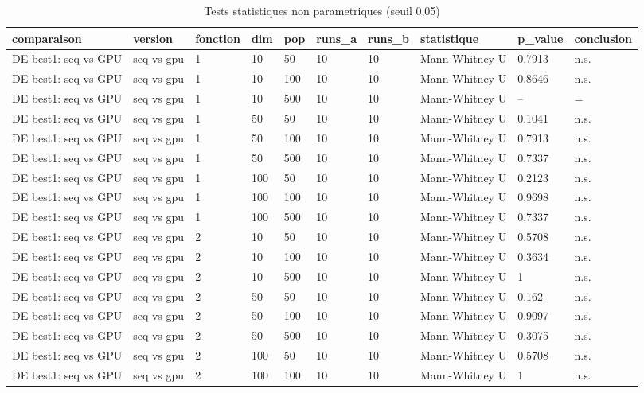 \begin{table}[t]
\centering
\caption{Tests statistiques non parametriques (seuil 0,05)}
\label{tab:generated-tests}
\scriptsize
\begin{tabular}{llllllllll}
\toprule
comparaison & version & fonction & dim & pop & runs\_a & runs\_b & statistique & p\_value & conclusion \\
\midrule
DE best1: seq vs GPU & seq vs gpu & 1 & 10 & 50 & 10 & 10 & Mann-Whitney U & 0.7913 & n.s. \\
DE best1: seq vs GPU & seq vs gpu & 1 & 10 & 100 & 10 & 10 & Mann-Whitney U & 0.8646 & n.s. \\
DE best1: seq vs GPU & seq vs gpu & 1 & 10 & 500 & 10 & 10 & Mann-Whitney U & -- & = \\
DE best1: seq vs GPU & seq vs gpu & 1 & 50 & 50 & 10 & 10 & Mann-Whitney U & 0.1041 & n.s. \\
DE best1: seq vs GPU & seq vs gpu & 1 & 50 & 100 & 10 & 10 & Mann-Whitney U & 0.7913 & n.s. \\
DE best1: seq vs GPU & seq vs gpu & 1 & 50 & 500 & 10 & 10 & Mann-Whitney U & 0.7337 & n.s. \\
DE best1: seq vs GPU & seq vs gpu & 1 & 100 & 50 & 10 & 10 & Mann-Whitney U & 0.2123 & n.s. \\
DE best1: seq vs GPU & seq vs gpu & 1 & 100 & 100 & 10 & 10 & Mann-Whitney U & 0.9698 & n.s. \\
DE best1: seq vs GPU & seq vs gpu & 1 & 100 & 500 & 10 & 10 & Mann-Whitney U & 0.7337 & n.s. \\
DE best1: seq vs GPU & seq vs gpu & 2 & 10 & 50 & 10 & 10 & Mann-Whitney U & 0.5708 & n.s. \\
DE best1: seq vs GPU & seq vs gpu & 2 & 10 & 100 & 10 & 10 & Mann-Whitney U & 0.3634 & n.s. \\
DE best1: seq vs GPU & seq vs gpu & 2 & 10 & 500 & 10 & 10 & Mann-Whitney U & 1 & n.s. \\
DE best1: seq vs GPU & seq vs gpu & 2 & 50 & 50 & 10 & 10 & Mann-Whitney U & 0.162 & n.s. \\
DE best1: seq vs GPU & seq vs gpu & 2 & 50 & 100 & 10 & 10 & Mann-Whitney U & 0.9097 & n.s. \\
DE best1: seq vs GPU & seq vs gpu & 2 & 50 & 500 & 10 & 10 & Mann-Whitney U & 0.3075 & n.s. \\
DE best1: seq vs GPU & seq vs gpu & 2 & 100 & 50 & 10 & 10 & Mann-Whitney U & 0.5708 & n.s. \\
DE best1: seq vs GPU & seq vs gpu & 2 & 100 & 100 & 10 & 10 & Mann-Whitney U & 1 & n.s. \\

\end{tabular}
\end{table}
